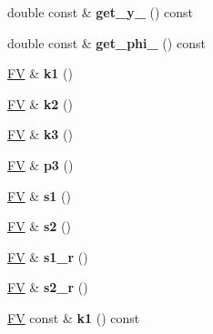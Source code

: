 \begin{DoxyCompactItemize}
\item 
\hypertarget{classPS__2__3_a3457627140be3cc125973b9349543a54}{double const \& {\bfseries get\-\_\-y\-\_} () const }\label{classPS__2__3_a3457627140be3cc125973b9349543a54}

\item 
\hypertarget{classPS__2__3_a1473a8cfc594bdc90d88304c41ab680b}{double const \& {\bfseries get\-\_\-phi\-\_} () const }\label{classPS__2__3_a1473a8cfc594bdc90d88304c41ab680b}

\item 
\hypertarget{classPS__2__3_a202ec7b64ebba9be65a98d981df496d3}{\hyperlink{classFV}{F\-V} \& {\bfseries k1} ()}\label{classPS__2__3_a202ec7b64ebba9be65a98d981df496d3}

\item 
\hypertarget{classPS__2__3_a812a24d352e8c6550657abdb49c24b58}{\hyperlink{classFV}{F\-V} \& {\bfseries k2} ()}\label{classPS__2__3_a812a24d352e8c6550657abdb49c24b58}

\item 
\hypertarget{classPS__2__3_a3a779e7320a2d22b232c1cbc77b18a07}{\hyperlink{classFV}{F\-V} \& {\bfseries k3} ()}\label{classPS__2__3_a3a779e7320a2d22b232c1cbc77b18a07}

\item 
\hypertarget{classPS__2__3_a412b287c8eff0a075c6c3996b811d0c9}{\hyperlink{classFV}{F\-V} \& {\bfseries p3} ()}\label{classPS__2__3_a412b287c8eff0a075c6c3996b811d0c9}

\item 
\hypertarget{classPS__2__3_a3a74b4311b2d21c351fa7cb5beddd6b7}{\hyperlink{classFV}{F\-V} \& {\bfseries s1} ()}\label{classPS__2__3_a3a74b4311b2d21c351fa7cb5beddd6b7}

\item 
\hypertarget{classPS__2__3_a76f07efbe991b939e4afb36fe7237642}{\hyperlink{classFV}{F\-V} \& {\bfseries s2} ()}\label{classPS__2__3_a76f07efbe991b939e4afb36fe7237642}

\item 
\hypertarget{classPS__2__3_ae37a4d3ecc54651115791066f99ce803}{\hyperlink{classFV}{F\-V} \& {\bfseries s1\-\_\-r} ()}\label{classPS__2__3_ae37a4d3ecc54651115791066f99ce803}

\item 
\hypertarget{classPS__2__3_af17dff958c76a8b1873f50acd5dbc446}{\hyperlink{classFV}{F\-V} \& {\bfseries s2\-\_\-r} ()}\label{classPS__2__3_af17dff958c76a8b1873f50acd5dbc446}

\item 
\hypertarget{classPS__2__3_a512b056d5b068136ef632216f520ea53}{\hyperlink{classFV}{F\-V} const \& {\bfseries k1} () const }\label{classPS__2__3_a512b056d5b068136ef632216f520ea53}


\end{DoxyCompactItemize}
